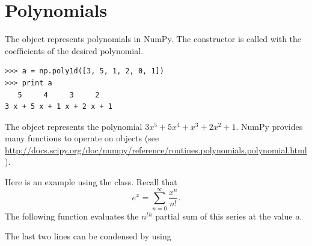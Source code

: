 \section*{Polynomials}
The  object represents polynomials in NumPy. The constructor is called with the coefficients of the desired polynomial. 

\begin{lstlisting}
>>> a = np.poly1d([3, 5, 1, 2, 0, 1])
>>> print a
   5     4     3     2
3 x + 5 x + 1 x + 2 x + 1
\end{lstlisting}

The object  represents the polynomial $3x^5+5x^4+x^3+2x^2+1$.
NumPy provides many functions to operate on  objects (see \url{http://docs.scipy.org/doc/numpy/reference/routines.polynomials.polynomial.html}).

Here is an example using the  class. Recall that
\[
e^x = \sum_{n=0}^{\infty} \frac{x^n}{n!}.
\]
The following function evaluates the $n^{th}$ partial sum of this series at the value $a$.

The last two lines can be condensed by using

